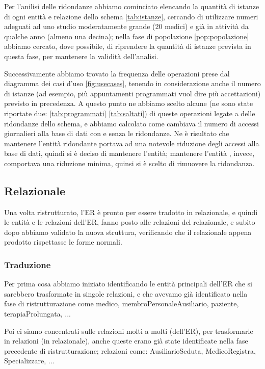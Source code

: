 \documentclass[11pt]{article}
\begin{document}
Per l'anilisi delle ridondanze abbiamo cominciato elencando la quantità di istanze di ogni entità e relazione dello schema \ref{tab:istanze}, cercando di utilizzare numeri adeguati ad uno studio moderatamente grande (20 medici) e già in attività da qualche anno (almeno una decina); nella fase di popolazione \ref{pop:popolazione} abbiamo cercato, dove possibile, di riprendere la quantità di istanze prevista in questa fase, per mantenere la validità dell'analisi.

Successivamente abbiamo trovato la frequenza delle operazioni prese dal diagramma dei casi d'uso \ref{fig:usecases}, tenendo in considerazione anche il numero di istanze (ad esempio, più appuntamenti programmati vuol dire più accettazioni) previsto in precedenza. A questo punto ne abbiamo scelto alcune (ne sono state riportate due: \ref{tab:programmati} \ref{tab:saltati}) di queste operazioni legate a delle ridondanze dello schema, e abbiamo calcolato come cambiava il numero di accessi giornalieri alla base di dati con e senza le ridondanze. Ne è risultato che mantenere l'entità ridondante  portava ad una notevole riduzione degli accessi alla base di dati, quindi si è deciso di mantenere l'entità; mantenere l'entità , invece, comportava una riduzione minima, quinsi si è scelto di rimuovere la ridondanza.

\subsection{Relazionale}
Una volta ristrutturato, l'ER è pronto per essere tradotto in relazionale, e quindi le entità e le relazioni dell'ER, fanno posto alle relazioni del relazionale, e subito dopo abbiamo 
validato la nuova struttura, verificando che il relazionale appena prodotto rispettasse le forme normali.
\subsubsection{Traduzione}

Per prima cosa abbiamo iniziato identificando le entità principali dell'ER che si sarebbero trasformate in singole relazioni, e che avevamo già identificato nella fase di ristrutturazione come medico, membroPersonaleAusiliario, paziente, terapiaProlungata, ...

Poi ci siamo concentrati sulle relazioni molti a molti (dell'ER), per trasformarle in relazioni (in relazionale), anche queste erano già state identificate nella fase precedente di ristrutturazione; relazioni come: AusiliarioSeduta, MedicoRegistra, Specializzare, ...
\end{document}
